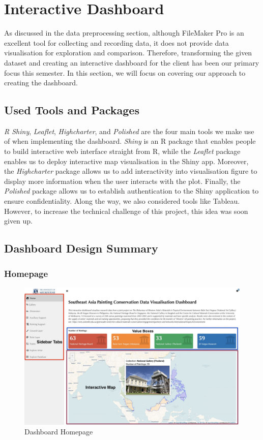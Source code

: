 \documentclass[11pt, oneside]{article}
\begin{document}
\section{Interactive Dashboard}
As discussed in the data preprocessing section, although FileMaker Pro is an excellent tool for collecting and recording data, it does not provide data visualisation for exploration and comparison. Therefore, transforming the given dataset and creating an interactive dashboard for the client has been our primary focus this semester. In this section, we will focus on covering our approach to creating the dashboard.

\subsection{Used Tools and Packages}
\textit{R Shiny}, \textit{Leaflet}, \textit{Highcharter}, and \textit{Polished} are the four main tools we make use of when implementing the dashboard. \textit{Shiny} is an R package that enables people to build interactive web interface straight from R, while the \textit{Leaflet} package enables us to deploy interactive map visualisation in the Shiny app. Moreover, the \textit{Highcharter} package allows us to add interactivity into visualisation figure to display more information when the user interacts with the plot. Finally, the \textit{Polished} package allows us to establish authentication to the Shiny application to ensure confidentiality.
\bigbreak
\noindent Along the way, we also considered tools like Tableau. However, to increase the technical challenge of this project, this idea was soon given up.

\subsection{Dashboard Design Summary}
\subsubsection{Homepage}
\begin{figure}[H]
    \centering
    \includegraphics[scale=0.2]{images/Dashboard Homepage Screenshot.png}
    \caption{Dashboard Homepage}
    \label{dashboard_home}
\end{figure}
\end{document}
